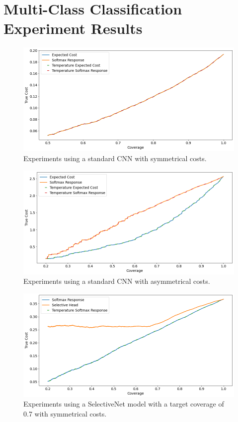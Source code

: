 \newpage
\section{Multi-Class Classification Experiment Results}
\begin{figure}[h]
	\includegraphics[width=\textwidth]{images/multi-class/cnn-sym.png}
	\caption*{Experiments using a standard CNN with symmetrical costs.}
\end{figure}

\begin{figure}[h]
	\includegraphics[width=\textwidth]{images/multi-class/cnn-asym.png}
	\caption*{Experiments using a standard CNN with asymmetrical costs.}
\end{figure}

\begin{figure}[h]
	\includegraphics[width=\textwidth]{images/multi-class/sn0.7-sym.png}
	\caption*{Experiments using a SelectiveNet model with a target coverage of 0.7 with symmetrical costs.}
\end{figure}

